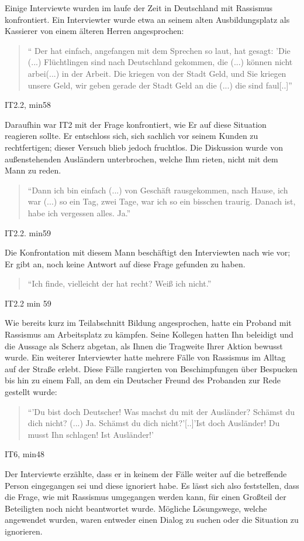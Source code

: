 Einige Interviewte wurden im laufe der Zeit in Deutschland mit Rassismus konfrontiert. Ein Interviewter wurde etwa an seinem alten Ausbildungsplatz als Kassierer von einem älteren Herren angesprochen:
\begin{quote}
    `` Der hat einfach, angefangen mit dem Sprechen so laut, hat gesagt: 'Die (...) Flüchtlingen sind nach Deutschland gekommen, die (...) können nicht arbei(...) in der Arbeit. Die kriegen von der Stadt Geld, und Sie kriegen unsere Geld, wir geben gerade der Stadt Geld an die (...) die sind faul[..]'' 
\end{quote}
\caption{IT2.2, min58}
Daraufhin war IT2 mit der Frage konfrontiert, wie Er auf diese Situation reagieren sollte. Er entschloss sich, sich sachlich vor seinem Kunden zu rechtfertigen; dieser Versuch blieb jedoch fruchtlos. Die Diskussion wurde von außenstehenden Ausländern unterbrochen, welche Ihm rieten, nicht mit dem Mann zu reden.
\begin{quote}
    ``Dann ich bin einfach (...) von Geschäft rausgekommen, nach Hause, ich war (...) so ein Tag, zwei Tage, war ich so ein bisschen traurig. Danach ist, habe ich vergessen alles. Ja.''
\end{quote}
\caption{IT2.2. min59}
Die Konfrontation mit diesem Mann beschäftigt den Interviewten nach wie vor; Er gibt an, noch keine Antwort auf diese Frage gefunden zu haben.
\begin{quote}
    ``Ich finde, vielleicht der hat recht? Weiß ich nicht.''
\end{quote}
\caption{IT2.2 min 59}
Wie bereits kurz im Teilabschnitt Bildung angesprochen, hatte ein Proband mit Rassismus am Arbeitsplatz zu kämpfen. Seine Kollegen hatten Ihn beleidigt und die Aussage als Scherz abgetan, als Ihnen die Tragweite Ihrer Aktion bewusst wurde.\newline
Ein weiterer Interviewter hatte mehrere Fälle von Rassismus im Alltag auf der Straße erlebt. Diese Fälle rangierten von Beschimpfungen über Bespucken bis hin zu einem Fall, an dem ein Deutscher Freund des Probanden zur Rede gestellt wurde:
\begin{quote}
    ``'Du bist doch Deutscher! Was machst du mit der Ausländer? Schämst du dich nicht? (...) Ja. Schämst du dich nicht?'[..]'Ist doch Ausländer! Du musst Ihn schlagen! Ist Ausländer!'
\end{quote}
\caption{IT6, min48}
Der Interviewte erzählte, dass er in keinem der Fälle weiter auf die betreffende Person eingegangen sei und diese ignoriert habe.\newline
Es lässt sich also feststellen, dass die Frage, wie mit Rassismus umgegangen werden kann, für einen Großteil der Beteiligten noch nicht beantwortet wurde. Mögliche Lösungswege, welche angewendet wurden, waren entweder einen Dialog zu suchen oder die Situation zu ignorieren.

